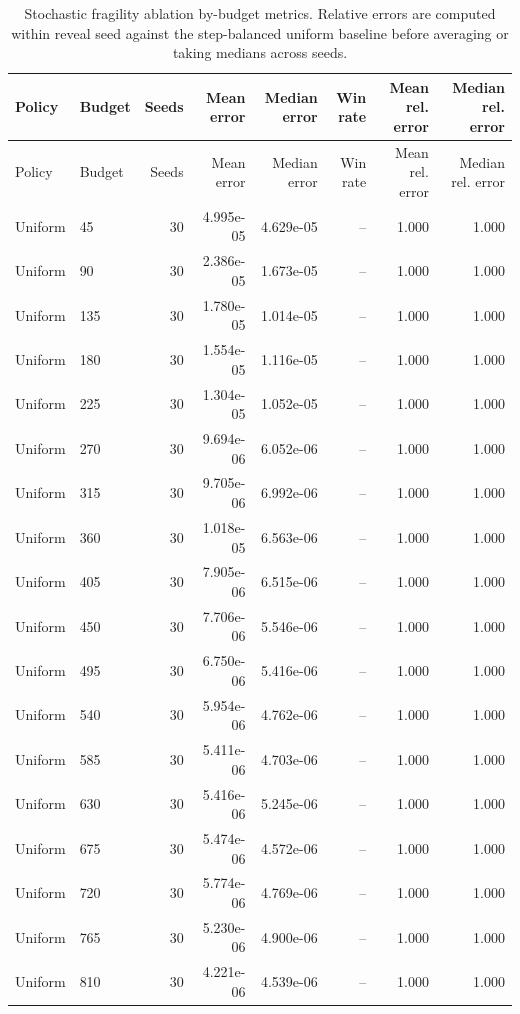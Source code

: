\begin{scriptsize}
\begin{longtable}{llrrrrrr}
\caption{Stochastic fragility ablation by-budget metrics. Relative errors are computed within reveal seed against the step-balanced uniform baseline before averaging or taking medians across seeds.}\label{tab:stochastic-ablation-by-budget-metrics}\\
\toprule
Policy & Budget & Seeds & Mean error & Median error & Win rate & Mean rel. error & Median rel. error \\
\midrule
\endfirsthead
\toprule
Policy & Budget & Seeds & Mean error & Median error & Win rate & Mean rel. error & Median rel. error \\
\midrule
\endhead
Uniform & 45 & 30 & 4.995e-05 & 4.629e-05 & -- & 1.000 & 1.000 \\
Uniform & 90 & 30 & 2.386e-05 & 1.673e-05 & -- & 1.000 & 1.000 \\
Uniform & 135 & 30 & 1.780e-05 & 1.014e-05 & -- & 1.000 & 1.000 \\
Uniform & 180 & 30 & 1.554e-05 & 1.116e-05 & -- & 1.000 & 1.000 \\
Uniform & 225 & 30 & 1.304e-05 & 1.052e-05 & -- & 1.000 & 1.000 \\
Uniform & 270 & 30 & 9.694e-06 & 6.052e-06 & -- & 1.000 & 1.000 \\
Uniform & 315 & 30 & 9.705e-06 & 6.992e-06 & -- & 1.000 & 1.000 \\
Uniform & 360 & 30 & 1.018e-05 & 6.563e-06 & -- & 1.000 & 1.000 \\
Uniform & 405 & 30 & 7.905e-06 & 6.515e-06 & -- & 1.000 & 1.000 \\
Uniform & 450 & 30 & 7.706e-06 & 5.546e-06 & -- & 1.000 & 1.000 \\
Uniform & 495 & 30 & 6.750e-06 & 5.416e-06 & -- & 1.000 & 1.000 \\
Uniform & 540 & 30 & 5.954e-06 & 4.762e-06 & -- & 1.000 & 1.000 \\
Uniform & 585 & 30 & 5.411e-06 & 4.703e-06 & -- & 1.000 & 1.000 \\
Uniform & 630 & 30 & 5.416e-06 & 5.245e-06 & -- & 1.000 & 1.000 \\
Uniform & 675 & 30 & 5.474e-06 & 4.572e-06 & -- & 1.000 & 1.000 \\
Uniform & 720 & 30 & 5.774e-06 & 4.769e-06 & -- & 1.000 & 1.000 \\
Uniform & 765 & 30 & 5.230e-06 & 4.900e-06 & -- & 1.000 & 1.000 \\
Uniform & 810 & 30 & 4.221e-06 & 4.539e-06 & -- & 1.000 & 1.000 \\

\end{longtable}
\end{scriptsize}
